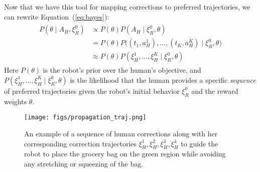 
Now that we have this tool for mapping corrections to preferred trajectories, we can rewrite Equation~(\ref{eq:bayes}):
\begin{eqnarray}
\begin{aligned}
    P(\theta \mid A_H, \xi_R^0) &\propto P(\theta) P(A_H \mid \xi_R^0, \theta) \\
    &= P(\theta)P\Big((t_1, a_H^1), \ldots, (t_K, a_H^K) \mid \xi_R^0, \theta\Big) \\
    &\approx P(\theta)P(\xi_H^1, \ldots, \xi_H^K \mid \xi_R^0, \theta)
\end{aligned}
\label{eq:bayesian}
\end{eqnarray}
Here $P(\theta)$ is the robot's prior over the human's objective, and $P(\xi_H^1, \ldots, \xi_H^K \mid \xi_R^0, \theta)$ is the likelihood that the human provides a specific \textit{sequence} of preferred trajectories given the robot's initial behavior $\xi_R^0$ and the reward weights $\theta$.


\begin{figure*}[t]
	\begin{center}
		\texttt{[image: figs/propagation\_traj.png]}

		\caption{An example of a sequence of human corrections along with her corresponding correction trajectories $\xi_H^1, \xi_H^2, \xi_H^3, \xi_H^4$ to guide the robot to place the grocery bag on the green region while avoiding any stretching or squeezing of the bag.}
		\label{fig:propogation_traj}
	\end{center}
	
 	\vspace{-2em}
\end{figure*}

